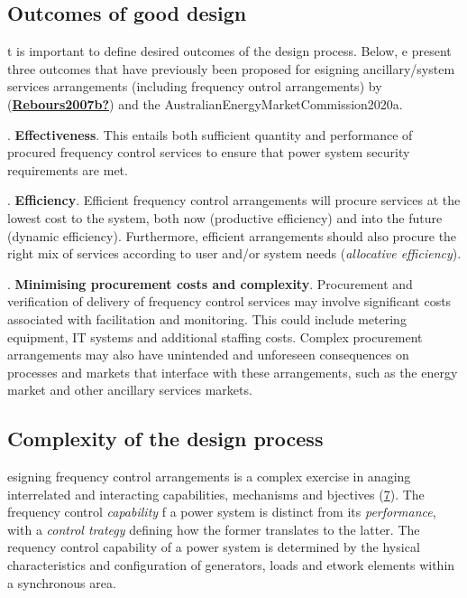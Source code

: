 \documentclass[12pt,a4paper,]{report}
\begin{document}
\hypertarget{outcomes-of-good-design}{%
\subsection{Outcomes of good design}\label{outcomes-of-good-design}}

t is important to define desired outcomes of the design process. Below,
e present three outcomes that have previously been proposed for esigning
ancillary/system services arrangements (including frequency ontrol
arrangements) by
(\protect\hyperlink{ref-Rebours2007b}{\textbf{Rebours2007b?}}) and the
AustralianEnergyMarketCommission2020a.

. \textbf{Effectiveness}. This entails both sufficient quantity and
performance of procured frequency control services to ensure that power
system security requirements are met.

. \textbf{Efficiency}. Efficient frequency control arrangements will
procure services at the lowest cost to the system, both now (productive
efficiency) and into the future (dynamic efficiency). Furthermore,
efficient arrangements should also procure the right mix of services
according to user and/or system needs (\emph{allocative efficiency}).

. \textbf{Minimising procurement costs and complexity}. Procurement and
verification of delivery of frequency control services may involve
significant costs associated with facilitation and monitoring. This
could include metering equipment, IT systems and additional staffing
costs. Complex procurement arrangements may also have unintended and
unforeseen consequences on processes and markets that interface with
these arrangements, such as the energy market and other ancillary
services markets.

\hypertarget{complexity-of-the-design-process}{%
\subsection{Complexity of the design
process}\label{complexity-of-the-design-process}}

esigning frequency control arrangements is a complex exercise in anaging
interrelated and interacting capabilities, mechanisms and bjectives
(\protect\hyperlink{fig:design_complexity}{7}). The frequency control
\emph{capability} f a power system is distinct from its
\emph{performance}, with a \emph{control trategy} defining how the
former translates to the latter. The requency control capability of a
power system is determined by the hysical characteristics and
configuration of generators, loads and etwork elements within a
synchronous area.
\end{document}
